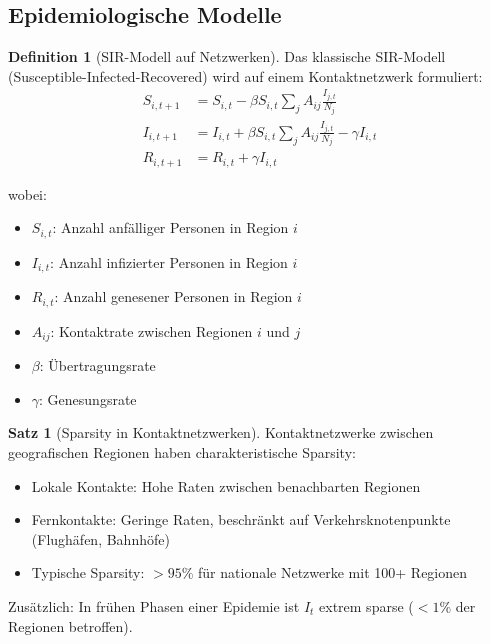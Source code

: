 \documentclass[a4paper,12pt]{report}
\theoremstyle{definition}
\newtheorem{definition}{Definition}
\newtheorem{satz}{Satz}
\begin{document}
	\subsection{Epidemiologische Modelle}
	
	\begin{definition}[SIR-Modell auf Netzwerken]
		Das klassische SIR-Modell (Susceptible-Infected-Recovered) wird auf einem Kontaktnetzwerk formuliert:
		\begin{align}
			S_{i,t+1} &= S_{i,t} - \beta S_{i,t} \sum_{j} A_{ij} \frac{I_{j,t}}{N_j} \\
			I_{i,t+1} &= I_{i,t} + \beta S_{i,t} \sum_{j} A_{ij} \frac{I_{j,t}}{N_j} - \gamma I_{i,t} \\
			R_{i,t+1} &= R_{i,t} + \gamma I_{i,t}
		\end{align}
		
		wobei:
		\begin{itemize}
			\item $S_{i,t}$: Anzahl anfälliger Personen in Region $i$
			\item $I_{i,t}$: Anzahl infizierter Personen in Region $i$
			\item $R_{i,t}$: Anzahl genesener Personen in Region $i$
			\item $A_{ij}$: Kontaktrate zwischen Regionen $i$ und $j$
			\item $\beta$: Übertragungsrate
			\item $\gamma$: Genesungsrate
		\end{itemize}
	\end{definition}
	
	\begin{satz}[Sparsity in Kontaktnetzwerken]
		Kontaktnetzwerke zwischen geografischen Regionen haben charakteristische Sparsity:
		\begin{itemize}
			\item Lokale Kontakte: Hohe Raten zwischen benachbarten Regionen
			\item Fernkontakte: Geringe Raten, beschränkt auf Verkehrsknotenpunkte (Flughäfen, Bahnhöfe)
			\item Typische Sparsity: $> 95\%$ für nationale Netzwerke mit 100+ Regionen
		\end{itemize}
		
		Zusätzlich: In frühen Phasen einer Epidemie ist $I_t$ extrem sparse ($< 1\%$ der Regionen betroffen).
	\end{satz}
	
\end{document}
